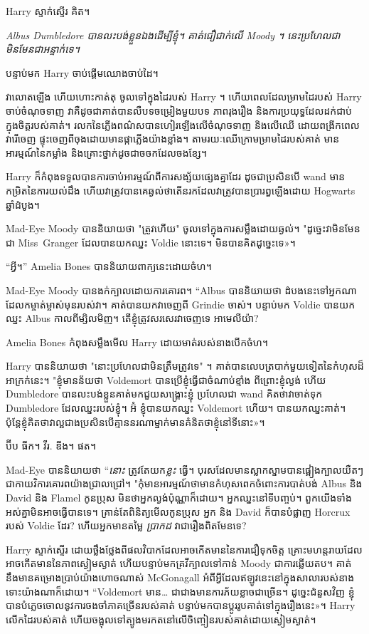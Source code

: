 Harry ស្ទាក់ស្ទើរ គិត។

\emph{Albus Dumbledore បានលះបង់ខ្លួនឯងដើម្បីខ្ញុំ។ គាត់ជឿជាក់លើ Moody ។ នេះប្រហែលជាមិនមែនជាអន្ទាក់ទេ។}

បន្ទាប់មក Harry ចាប់ផ្តើមឈោងចាប់ដៃ។

វាលោតឡើង ហើយហោះកាត់តុ ចូលទៅក្នុងដៃរបស់ Harry ។ ហើយពេលដែលម្រាមដៃរបស់ Harry ចាប់ចំណុចទាញ វាគឺដូចជាគាត់បានលឺបទចម្រៀងមួយបទ ភាពរុងរឿង និងការប្រយុទ្ធដែលដក់ជាប់ក្នុងចិត្តរបស់គាត់។ រលក​នៃ​ភ្លើង​ពណ៌​ស​បាន​ហៀរ​ឡើង​លើ​ចំណុច​ទាញ និង​លើ​ឈើ ដោយ​ពង្រីក​ពេល​វា​រើ​ចេញ ផ្ទុះ​ចេញ​ពី​ចុង​ដោយ​មាន​ផ្កាភ្លើង​យ៉ាង​ខ្លាំង។ តាមរយៈឈើក្រោមម្រាមដៃរបស់គាត់ មានអារម្មណ៍នៃកម្លាំង និងគ្រោះថ្នាក់ដូចជាចចកដែលចងខ្សែ។

Harry ក៏កំពុងទទួលបានការចាប់អារម្មណ៍ពីការសង្ស័យផ្សេងគ្នាដែរ ដូចជាប្រសិនបើ wand មានកម្រិតនៃការយល់ដឹង ហើយវាត្រូវបានគេឆ្ងល់ថាតើនរកដែលវាត្រូវបានប្រារព្ធឡើងដោយ Hogwarts ឆ្នាំដំបូង។

Mad-Eye Moody បាននិយាយថា "ត្រូវហើយ" ចូលទៅក្នុងការសម្លឹងដោយឆ្ងល់។ "ដូច្នេះវាមិនមែនជា Miss~Granger ដែលបានយកឈ្នះ Voldie នោះទេ។ មិន​បាន​គិត​ដូច្នេះ​ទេ»។

“អ្វី។” Amelia Bones បាន​និយាយ​ពាក្យ​នេះ​ដោយ​ចំហ។

Mad-Eye Moody បានងក់ក្បាលដោយការគោរព។ “Albus បាននិយាយថា ដំបងនេះទៅអ្នកណាដែលកម្ចាត់ម្ចាស់មុនរបស់វា។ គាត់បានយកវាចេញពី Grindie ចាស់។ បន្ទាប់មក Voldie បានយកឈ្នះ Albus កាលពីម្សិលមិញ។ តើ​ខ្ញុំ​ត្រូវ​សរសេរ​វា​ចេញ​ទេ អាមេលីយ៉ា?

Amelia Bones កំពុងសម្លឹងមើល Harry ដោយមាត់របស់នាងបើកចំហ។

Harry បាននិយាយថា "នោះប្រហែលជាមិនត្រឹមត្រូវទេ" ។ គាត់បានលេបត្របាក់មួយទៀតនៃកំហុសដ៏អាក្រក់នេះ។ "ខ្ញុំមានន័យថា Voldemort បានប្រើខ្ញុំធ្វើជាចំណាប់ខ្មាំង ពីព្រោះខ្ញុំល្ងង់ ហើយ Dumbledore បានលះបង់ខ្លួនគាត់មកជួយសង្គ្រោះខ្ញុំ ប្រហែលជា wand គិតថាវាចាត់ទុក Dumbledore ដែលឈ្នះរបស់ខ្ញុំ។ អ៊ំ ខ្ញុំបានយកឈ្នះ Voldemort ហើយ។ បានយកឈ្នះគាត់។ ប៉ុន្តែ​ខ្ញុំ​គិត​ថា​វា​ល្អ​ជាង​ប្រសិន​បើ​គ្មាន​នរណា​ម្នាក់​មាន​គំនិត​ថា​ខ្ញុំ​នៅ​ទីនោះ​»។

ប៊ីប ធីក។ វីរ. ឌីង។ ផត។

Mad-Eye បាននិយាយថា “\emph{នោះ} ត្រូវតែយក\emph{ខ្លះ} ធ្វើ។ បុរស​ដែល​មាន​ស្លាក​ស្នាម​បាន​ផ្អៀង​ក្បាល​យឺតៗ ជា​កាយវិការ​គោរព​យ៉ាង​ជ្រាលជ្រៅ។ "កុំមានអារម្មណ៍ថាមានកំហុសពេកចំពោះការបាត់បង់ Albus និង David និង Flamel កូនប្រុស មិនថាអ្នកល្ងង់ប៉ុណ្ណាក៏ដោយ។ អ្នកឈ្នះនៅទីបញ្ចប់។ ពួកយើងទាំងអស់គ្នាមិនអាចធ្វើបានទេ។ គ្រាន់តែពិនិត្យមើលកូនប្រុស អ្នក និង David ក៏បានបំផ្លាញ Horcrux របស់ Voldie ដែរ? ហើយអ្នកមានតម្លៃ \emph{ប្រាកដ} វាជារឿងពិតមែនទេ?

Harry ស្ទាក់ស្ទើរ ដោយថ្លឹងថ្លែងពីផលវិបាកដែលអាចកើតមាននៃការជឿទុកចិត្ត គ្រោះមហន្តរាយដែលអាចកើតមាននៃភាពស្ងៀមស្ងាត់ ហើយបន្ទាប់មកគ្រវីក្បាលទៅកាន់ Moody ជាការឆ្លើយតប។ គាត់នឹងមានគម្រោងប្រាប់យ៉ាងហោចណាស់ McGonagall អំពីអ្វីដែលឥឡូវនេះនៅក្នុងសាលារបស់នាង ទោះយ៉ាងណាក៏ដោយ។ “Voldemort មាន… ជា​ជាង​មាន​ការ​ភ័យ​ខ្លាច​ជា​ច្រើន​។ ដូច្នេះ​ជំនួស​វិញ ខ្ញុំ​បាន​បំភ្លេច​ចោល​នូវ​ការ​ចង​ចាំ​ភាគ​ច្រើន​របស់​គាត់ បន្ទាប់​មក​បាន​ប្តូរ​រូប​គាត់​ទៅ​ក្នុង​រឿង​នេះ»។ Harry លើកដៃរបស់គាត់ ហើយចង្អុលទៅត្បូងមរកតនៅលើចិញ្ចៀនរបស់គាត់ដោយស្ងៀមស្ងាត់។

